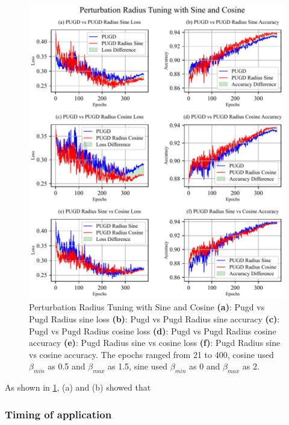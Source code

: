 \documentclass[10pt,twocolumn,letterpaper]{article}
\begin{document}
\begin{figure}[htbp]
	\center
	\vspace{-10pt} 
	\includegraphics[width=\columnwidth]{images/PUGDRadius.pdf}
	\caption{Perturbation Radius Tuning with Sine and Cosine
	\textbf{(a)}: Pugd vs Pugd Radius sine loss \textbf{(b)}: Pugd vs Pugd Radius sine accuracy
    \textbf{(c)}: Pugd vs Pugd Radius cosine loss \textbf{(d)}: Pugd vs Pugd Radius cosine accuracy
	\textbf{(e)}: Pugd Radius sine vs cosine loss \textbf{(f)}: Pugd Radius sine vs cosine accuracy. The epochs ranged from 21 to 400, cosine used $\beta_{min}$ as 0.5 and $\beta_{max}$ as 1.5, sine used $\beta_{min}$ as 0 and $\beta_{max}$ as 2.}
	\vspace{-15pt} 
	\label{fig:PUGDRadius}
\end{figure}
As shown in \cref{fig:PUGDRadius}, (a) and (b) showed that 



\subsubsection{Timing of application}
\label{subsec:4.1.2}
\end{document}
